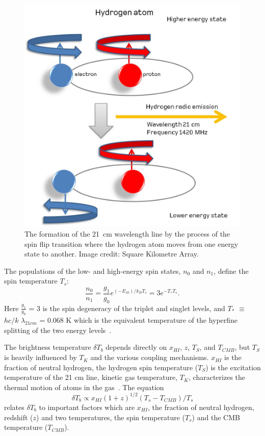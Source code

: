 	\begin{figure}
		\begin{center}
			\includegraphics[width=0.5\linewidth]{Figures/Hydrogenemission1.jpeg}
			\caption{The formation of the \SI{21}{cm} wavelength line by the process of the spin flip transition where the hydrogen atom moves from one energy state to another. Image credit: {Square Kilometre Array}.}
			\label{Fig:21cm}
		\end{center}
	\end{figure}
	
	The populations of the low- and high-energy spin states, $n_0$ and $n_1$, define the spin temperature $T_s$:
	\begin{equation}
	\frac{n_0}{n_1} = \frac{g_1}{g_0}e^{(-E_10)/{k_B}{T_s}} = 3e^{{-T_*}{T_s}}.
	\end{equation}
	Here $\frac{g_1}{g_0}$ = 3 is the spin degeneracy of the triplet and singlet levels, and $T_{*}$ $\equiv$ $hc/k$ $\lambda_{21cm}$ = 0.068 K which is the equivalent temperature of the hyperfine splitting of the two energy levels~\citep{2012RPPh...75h6901P}.
	
	The brightness temperature $\delta$$T_b$ depends directly on $x_{HI}$, $z$, $T_S$, and $T_{CMB}$, but $T_S$ is heavily influenced by $T_K$ and the various coupling mechanisms. $x_{HI}$ is the fraction of neutral hydrogen, the hydrogen spin temperature ($T_S$) is the excitation temperature of the 21 cm line, kinetic gas temperature, $T_K$, characterizes the thermal motion of atoms in the gas~\citep{2015aska.confE...1K,2006PhR...433..181F}. The equation	
	\begin{equation}
	\delta{T_b}\propto {x_{HI}}(1+z)^{1/2}({T_s}-{T_{CMB}})/{T_s}
	\end{equation}
	relates $\delta$$T_b$ to important factors which are \(x_{HI}\), the fraction of neutral hydrogen, redshift ($z$) and two temperatures, the spin temperature ($T_s$) and the CMB temperature ($T_{CMB}$).
		
